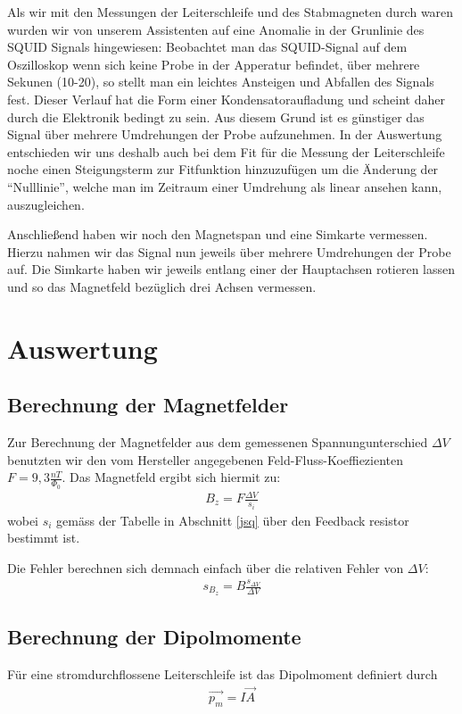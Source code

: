 \documentclass[12pt]{article}
\begin{document}
Als wir mit den Messungen der Leiterschleife und des Stabmagneten durch waren wurden wir von unserem Assistenten auf eine Anomalie in der Grunlinie des SQUID Signals hingewiesen: Beobachtet man das SQUID-Signal auf dem Oszilloskop wenn sich keine Probe in der Apperatur befindet, über mehrere Sekunen (10-20), so stellt man ein leichtes Ansteigen und Abfallen des Signals fest. Dieser Verlauf hat die Form einer Kondensatoraufladung und scheint daher durch die Elektronik bedingt zu sein. Aus diesem Grund ist es günstiger das Signal über mehrere Umdrehungen der Probe aufzunehmen. In der Auswertung entschieden wir uns deshalb auch bei dem Fit für die Messung der Leiterschleife noche einen Steigungsterm zur Fitfunktion hinzuzufügen um die Änderung der "`Nulllinie"', welche man im Zeitraum einer Umdrehung als linear ansehen kann, auszugleichen.

Anschließend haben wir noch den Magnetspan und eine Simkarte vermessen. Hierzu nahmen wir das Signal nun jeweils über mehrere Umdrehungen der Probe auf.
Die Simkarte haben wir jeweils entlang einer der Hauptachsen rotieren lassen und so das Magnetfeld bezüglich drei Achsen vermessen.

\section{Auswertung}
\subsection{Berechnung der Magnetfelder}
Zur Berechnung der Magnetfelder aus dem gemessenen Spannungunterschied $\varDelta V$ benutzten wir den vom Hersteller angegebenen Feld-Fluss-Koeffiezienten $F=9,3 \frac{nT}{\Phi_0}$. Das Magnetfeld ergibt sich hiermit zu:
\begin{align}
 B_z=F \frac{\varDelta V}{s_i}
\end{align}
wobei $s_i$ gemäss der Tabelle in Abschnitt \ref{jsq} über den Feedback resistor bestimmt ist.

Die Fehler berechnen sich demnach einfach über die relativen Fehler von $\varDelta V$:
\begin{align}
 s_{B_z} = B \frac{s_{\varDelta V}}{\varDelta V}
\end{align}
\subsection{Berechnung der Dipolmomente}
Für eine stromdurchflossene Leiterschleife ist das Dipolmoment definiert durch
\begin{align}
 \vec{p_m}=I \vec{A}
\end{align}
\end{document}
